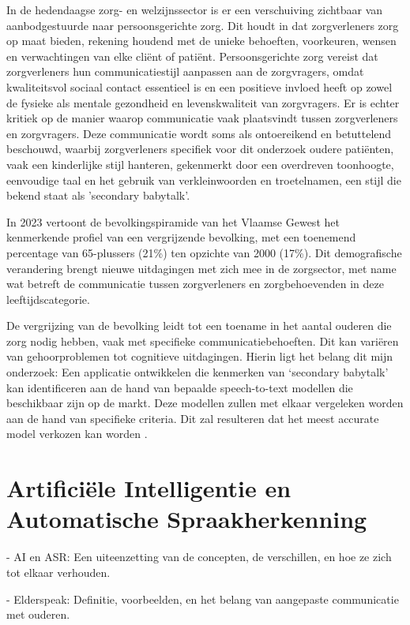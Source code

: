 In de hedendaagse zorg- en welzijnssector is er een verschuiving zichtbaar van aanbodgestuurde naar persoonsgerichte zorg. Dit houdt in dat zorgverleners zorg op maat bieden, rekening houdend met de unieke behoeften, voorkeuren, wensen en verwachtingen van elke cliënt of patiënt. Persoonsgerichte zorg vereist dat zorgverleners hun communicatiestijl aanpassen aan de zorgvragers, omdat kwaliteitsvol sociaal contact essentieel is en een positieve invloed heeft op zowel de fysieke als mentale gezondheid en levenskwaliteit van zorgvragers.
Er is echter kritiek op de manier waarop communicatie vaak plaatsvindt tussen zorgverleners en zorgvragers. Deze communicatie wordt soms als ontoereikend en betuttelend beschouwd, waarbij zorgverleners specifiek voor dit onderzoek oudere patiënten, vaak een kinderlijke stijl hanteren, gekenmerkt door een overdreven toonhoogte, eenvoudige taal en het gebruik van verkleinwoorden en troetelnamen, een stijl die bekend staat als 'secondary babytalk'.

In 2023 vertoont de bevolkingspiramide van het Vlaamse Gewest het kenmerkende profiel van een vergrijzende bevolking, met een toenemend percentage van 65-plussers (21\%) ten opzichte van 2000 (17\%). Dit demografische verandering brengt nieuwe uitdagingen met zich mee in de zorgsector, met name wat betreft de communicatie tussen zorgverleners en zorgbehoevenden in deze leeftijdscategorie.

De vergrijzing van de bevolking leidt tot een toename in het aantal ouderen die zorg nodig hebben, vaak met specifieke communicatiebehoeften. Dit kan variëren van gehoorproblemen tot cognitieve uitdagingen. Hierin ligt het belang dit mijn onderzoek: Een applicatie ontwikkelen die kenmerken van ‘secondary babytalk’ kan identificeren aan de hand van bepaalde speech-to-text modellen die beschikbaar zijn op de markt. Deze modellen zullen met elkaar vergeleken worden aan de hand van specifieke criteria. Dit zal resulteren dat het meest accurate model verkozen kan worden
\autocite{Vlaanderen.be}.
\section{Artificiële Intelligentie en Automatische Spraakherkenning}

   - AI en ASR: Een uiteenzetting van de concepten, de verschillen, en hoe ze zich tot elkaar verhouden. 

- Elderspeak: Definitie, voorbeelden, en het belang van aangepaste communicatie met ouderen. 


